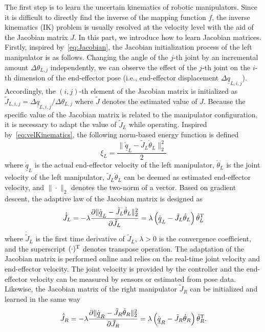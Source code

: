 \documentclass[journal,twoside,web]{ieeecolor}
\begin{document}
The first step is to learn the uncertain kinematics of robotic manipulators. Since it is difficult to directly find the inverse of the mapping function $f$, the inverse kinematics (IK) problem is usually resolved at the velocity level with the aid of the Jacobian matrix $J$. In this part, we introduce how to learn Jacobian matrices. Firstly, inspired by~\eqref{eq:Jacobian}, the Jacobian initialization process of the left manipulator is as follows. Changing the angle of the $j$-th joint by an incremental amount $\Delta \theta_{L,j}$ independently, we can observe the effect of the $j$-th joint on the $i$-th dimension of the end-effector pose (i.e., end-effector displacement $\Delta \underline{q}_{L,i,j}$). Accordingly, the $(i,j)$-th element of the Jacobian matrix is initialized as $\tilde{J}_{L,i,j} = \Delta \underline{q}_{L,i,j}/\Delta \theta_{L,j}$ where $\tilde J$ denotes the estimated value of $J$. Because the specific value of the Jacobian matrix is related to the manipulator configuration, it is necessary to adapt the value of $\tilde J_L$ while operating. Inspired by~\eqref{eq:velKinematics}, the following norm-based energy function is defined
\begin{equation}
\xi_L= \frac{\|\dot{\underline{q}}_L - \tilde J_L \dot{\theta}_L\|_2^2}{2}
\end{equation}
where $\dot{\underline{q}}_L$ is the actual end-effector velocity of the left manipulator, $\dot{\theta}_L$ is the joint velocity of the left manipulator, $\tilde J_L \dot{\theta}_L$ can be deemed as estimated end-effector velocity, and $\|\cdot\|_2$ denotes the two-norm of a vector. Based on gradient descent, the adaptive law of the Jacobian matrix is designed as
\begin{equation}
\dot{\tilde J}_L = - \lambda \frac{\partial \|\dot{\underline{q}}_L - \tilde J_L \dot{\theta}_L\|_2^2}{\partial \tilde J_L} = \lambda \left(\dot{\underline{q}}_L - \tilde J_L \dot{\theta}_L\right)\dot{\theta}_L^{\rm T}
\label{eq:leftJacobianLearning}
\end{equation}
where $\dot{\tilde J}_L$ is the first time derivative of ${\tilde J}_L$, $\lambda>0$ is the convergence coefficient, and the superscript $(\cdot)^{\rm T}$ denotes transpose operation. The adaptation of the Jacobian matrix is performed online and relies on the real-time joint velocity and end-effector velocity. The joint velocity is provided by the controller and the end-effector velocity can be measured by sensors or estimated from pose data. Likewise, the Jacobian matrix of the right manipulator $\tilde J_R$ can be initialized and learned in the same way
\begin{equation}
\dot{\tilde J}_R = - \lambda \frac{\partial \|\dot{\underline{q}}_R - \tilde J_R \dot{\theta}_R\|_2^2}{\partial \tilde J_R} = \lambda \left(\dot{\underline{q}}_R - \tilde J_R \dot{\theta}_R\right)\dot{\theta}_R^{\rm T}.
\label{eq:rightJacobianLearning}
\end{equation}
\end{document}

